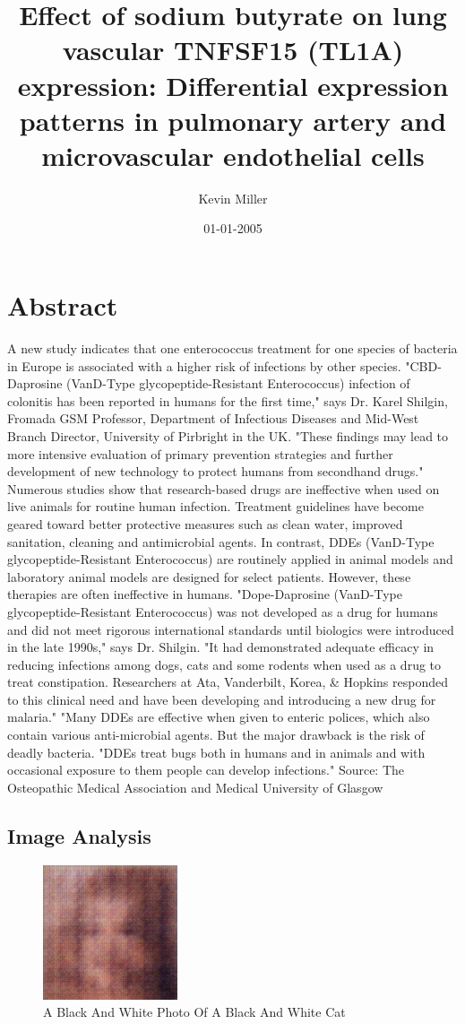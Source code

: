 \documentclass{article}%
\title{Effect of sodium butyrate on lung vascular TNFSF15 (TL1A) expression: Differential expression patterns in pulmonary artery and microvascular endothelial cells}%
\author{Kevin Miller}%
\affil{Department of Orthopedic Surgery, Xinhua Hospital, Shanghai Jiaotong University, School of Medicine, Shanghai 200092, P.R. China}%
\date{01{-}01{-}2005}%
\begin{document}
%
\normalsize%
\maketitle%
\section{Abstract}%
\label{sec:Abstract}%
A new study indicates that one enterococcus treatment for one species of bacteria in Europe is associated with a higher risk of infections by other species.\newline%
"CBD{-}Daprosine (VanD{-}Type glycopeptide{-}Resistant Enterococcus) infection of colonitis has been reported in humans for the first time," says Dr. Karel Shilgin, Fromada GSM Professor, Department of Infectious Diseases and Mid{-}West Branch Director, University of Pirbright in the UK. "These findings may lead to more intensive evaluation of primary prevention strategies and further development of new technology to protect humans from secondhand drugs."\newline%
Numerous studies show that research{-}based drugs are ineffective when used on live animals for routine human infection. Treatment guidelines have become geared toward better protective measures such as clean water, improved sanitation, cleaning and antimicrobial agents. In contrast, DDEs (VanD{-}Type glycopeptide{-}Resistant Enterococcus) are routinely applied in animal models and laboratory animal models are designed for select patients. However, these therapies are often ineffective in humans.\newline%
"Dope{-}Daprosine (VanD{-}Type glycopeptide{-}Resistant Enterococcus) was not developed as a drug for humans and did not meet rigorous international standards until biologics were introduced in the late 1990s," says Dr. Shilgin. "It had demonstrated adequate efficacy in reducing infections among dogs, cats and some rodents when used as a drug to treat constipation. Researchers at Ata, Vanderbilt, Korea, \& Hopkins responded to this clinical need and have been developing and introducing a new drug for malaria."\newline%
"Many DDEs are effective when given to enteric polices, which also contain various anti{-}microbial agents. But the major drawback is the risk of deadly bacteria.\newline%
"DDEs treat bugs both in humans and in animals and with occasional exposure to them people can develop infections."\newline%
Source: The Osteopathic Medical Association and Medical University of Glasgow

%
\subsection{Image Analysis}%
\label{subsec:ImageAnalysis}%


\begin{figure}[h!]%
\centering%
\includegraphics[width=150px]{500_fake_images/samples_5_176.png}%
\caption{A Black And White Photo Of A Black And White Cat}%
\end{figure}

%
\end{document}
